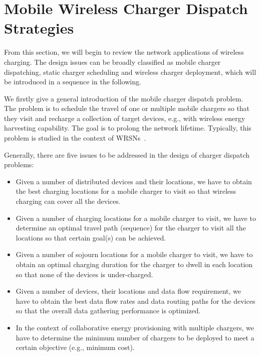 \documentclass[twocolumn,10pt]{IEEEtran}
\begin{document}
\section{Mobile Wireless Charger Dispatch Strategies}


From this section, we will begin to review the network applications of wireless charging. The design issues can be broadly classified as mobile charger dispatching, static charger scheduling and wireless charger deployment, which will be introduced in a sequence in the following.

We firstly give a general introduction of the mobile charger dispatch problem. The problem is to schedule the travel of one or multiple mobile chargers so that they visit and recharge a collection of target devices, e.g., with wireless energy harvesting capability. The goal is to prolong the network lifetime. Typically, this problem is studied in the context of WRSNs~\cite{Y.2015Yang}.    


Generally, there are five issues to be addressed in the design of charger dispatch problems:
\begin{itemize}

\item Given a number of distributed devices and their locations, we have to obtain the best charging locations for a mobile charger to visit so that wireless charging can cover all the devices.     

\item Given a number of charging locations for a mobile charger to visit, we have to determine an optimal travel path (sequence) for the charger to visit all the locations so that certain goal(s) can be achieved. 
 
\item Given a number of sojourn locations for a mobile charger to visit, we have to obtain an optimal charging duration for the charger to dwell in each location so that none of the devices is under-charged. 

\item Given a number of devices, their locations and data flow requirement, we have to obtain the best data flow rates and data routing paths for the devices so that the overall data gathering performance is optimized. 

\item In the context of collaborative energy provisioning with multiple chargers, we have to determine the minimum number of chargers to be deployed to meet a certain objective (e.g., minimum cost). 

\end{itemize}
\end{document}

